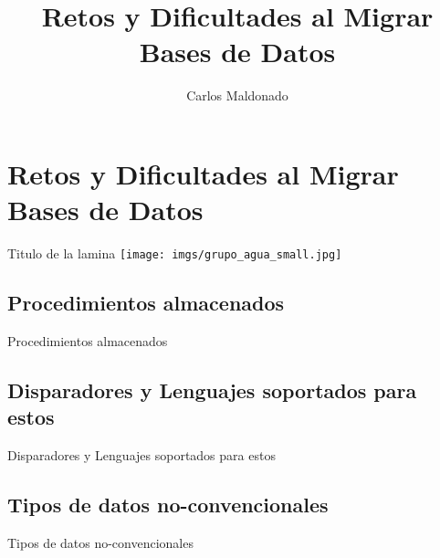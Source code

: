 

\title[DataBase] {Retos y Dificultades al Migrar Bases de Datos}
\author[cmaldonado@covetel.com.ve]{ Carlos Maldonado }
\subtitle{}



\begin{frame} %
    \maketitle 
\end{frame}

\begin{frame} %
    \tableofcontents
\end{frame}

\section{Retos y Dificultades al Migrar Bases de Datos}

\begin{frame}{Titulo de la lamina} %
    \texttt{[image: imgs/grupo\_agua\_small.jpg]}
\end{frame}

\subsection{Procedimientos almacenados}
\begin{frame}{Procedimientos almacenados}
	
\end{frame}


\subsection{Disparadores y Lenguajes soportados para estos}
\begin{frame}{Disparadores y Lenguajes soportados para estos}
	
\end{frame}


\subsection{Tipos de datos no-convencionales}
\begin{frame}{Tipos de datos no-convencionales}
	
\end{frame}


